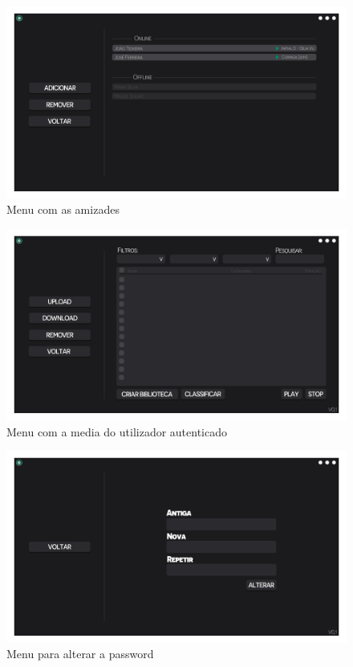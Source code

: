 \documentclass[a4paper]{report}
\begin{document}
\begin{figure}[H]
	\centering 
    \includegraphics[width=\textwidth]{images/Amigos_Menu.png}  
    \caption{Menu com as amizades}
\end{figure}

\begin{figure}[H]
	\centering 
    \includegraphics[width=\textwidth]{images/MyMedia_Menu.png}  
    \caption{Menu com a media do utilizador autenticado}
\end{figure}

\begin{figure}[H]
	\centering 
    \includegraphics[width=\textwidth]{images/AlterarPassword_Menu.png}  
    \caption{Menu para alterar a password}
\end{figure}
\end{document}
